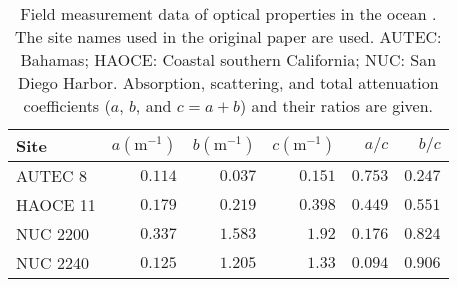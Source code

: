 \begin{table}[h]
  \centering
  \caption{Field measurement data of optical properties in the ocean \cite{petzold_volume_1972}.
    The site names used in the original paper are used. AUTEC: Bahamas; HAOCE: Coastal southern California; NUC: San Diego Harbor.
    Absorption, scattering, and total attenuation coefficients ($a$, $b$, and $c=a+b$) and their ratios are given.
  }
  \begin{tabular}{lrrrrr}
    \toprule
    Site & $a (\mbox{m}^{-1})$ & $b (\mbox{m}^{-1})$ & $c(\mbox{m}^{-1} )$ & $a/c$ & $b/c$ \\
    \midrule
    AUTEC 8 & $0.114$ & $0.037$ & $0.151$ & $0.753$ & $0.247$ \\
    HAOCE 11 & $0.179$ & $0.219$ & $0.398$ & $0.449$ & $0.551$ \\
    NUC 2200 & $0.337$ & $1.583$ & $1.92$ & $0.176$ & $0.824$ \\
    NUC 2240 & $0.125$ & $1.205$ & $1.33$ & $0.094$ & $0.906$ \\
    \bottomrule
  \end{tabular}
  \label{tab:petzold}
\end{table}

